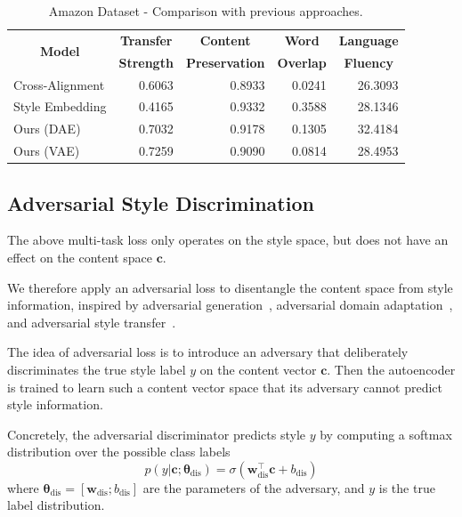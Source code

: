 \documentclass[11pt,a4paper]{article}
\newcommand{\tabh}[1]{\multicolumn{1}{c|}{\textbf{#1}}}
\newcommand{\tabc}[2]{\multicolumn{1}{|c|}{\multirow{#1}{*}{\textbf{#2}}}}
\begin{document}
\begin{table}[ht]
	\centering
	\begin{tabular}{| l | r | r | r | r |}
		\hline
		\tabc{2}{Model}                       & \tabh{Transfer} & \tabh{Content}      & \tabh{Word}    & \tabh{Language} \\
		                                      & \tabh{Strength} & \tabh{Preservation} & \tabh{Overlap} & \tabh{Fluency}  \\
		\hline
		\hline
		Cross-Alignment \citep{shen2017style} & 0.6063          & 0.8933              & 0.0241         & 26.3093         \\
		\hline
		Style Embedding \citep{fu2017style}   & 0.4165          & 0.9332              & 0.3588         & 28.1346         \\
		\hline
		Ours (DAE)                            & 0.7032          & 0.9178              & 0.1305         & 32.4184         \\
		\hline
		Ours (VAE)                            & 0.7259          & 0.9090              & 0.0814         & 28.4953         \\
		\hline
	\end{tabular}
	\caption{Amazon Dataset - Comparison with previous approaches.}
	\label{tab:amazon-comparison-previous}
\end{table}


\subsection{Adversarial Style Discrimination} \label{ssec:adversarial-style-objective}

The above multi-task loss only operates on the style space, but does not have an effect on the content space $\bm c$.

We therefore apply an adversarial loss to disentangle the content space from style information, inspired by adversarial generation~\cite{goodfellow2014generative}, adversarial domain adaptation~\cite{liu2017adversarial}, and adversarial style transfer~\cite{fu2017style}.

The idea of adversarial loss is to introduce an adversary that deliberately discriminates the true style label $y$ on the content vector $\bm c$. Then the autoencoder is trained to learn such a content vector space that its adversary cannot predict style information.

Concretely, the adversarial discriminator predicts style $y$ by computing a softmax distribution over the possible class labels
\begin{equation}
	p(y | \bm c; \bm\theta_\text{dis}) = \sigma(\bm w_\text{dis}^\top \bm c + b_\text{dis})
\end{equation}
where $\bm\theta_\text{dis}=[\bm w_\text{dis}; b_\text{dis}]$ are the parameters of the adversary, and $y$ is the true label distribution.
\end{document}
